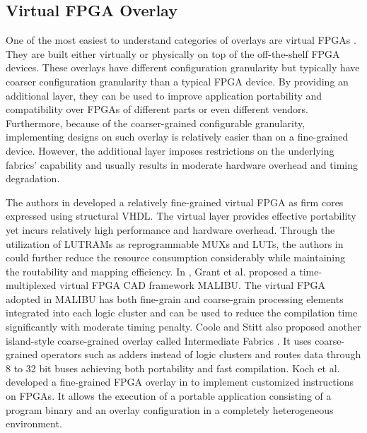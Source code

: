 \subsection{Virtual FPGA Overlay}
One of the most easiest to understand categories of overlays are virtual FPGAs \cite{lysecky2005firm, brant2012ZUMA, grant2011malibu, coole2010intermediate, koch2013efficient}. They are built either virtually or physically on top of the off-the-shelf FPGA devices. These overlays have different configuration granularity but typically have coarser configuration granularity than a typical FPGA device. By providing an additional layer, they can be used to improve application portability and compatibility over FPGAs of different parts or even different vendors. Furthermore, because of the coarser-grained configurable granularity, implementing designs on such overlay is relatively easier than on a fine-grained device. However, the additional layer imposes restrictions on the underlying fabrics' capability and usually results in moderate hardware overhead and timing degradation.

The authors in \cite{lysecky2005firm} developed a relatively fine-grained virtual FPGA as firm cores expressed using structural VHDL. The virtual layer provides effective portability yet incurs relatively high performance and hardware overhead. Through the utilization of LUTRAMs as reprogrammable MUXs and LUTs, the authors in \cite{brant2012ZUMA} could further reduce the resource consumption considerably while maintaining the routability and mapping efficiency. In \cite{grant2011malibu}, Grant et al. proposed a time-multiplexed virtual FPGA CAD framework MALIBU. The virtual FPGA adopted in MALIBU has both fine-grain and coarse-grain processing elements integrated into each logic cluster and can be used to reduce the compilation time significantly with moderate timing penalty. Coole and Stitt also proposed another island-style coarse-grained overlay called Intermediate Fabrics \cite{coole2010intermediate}. It uses coarse-grained operators such as adders instead of logic clusters and routes data through 8 to 32 bit buses achieving both portability and fast compilation. Koch et al. developed a fine-grained FPGA overlay in \cite{koch2013efficient} to implement customized instructions on FPGAs. It allows the execution of a portable application consisting of a program binary and an overlay configuration in a completely heterogeneous environment. 

